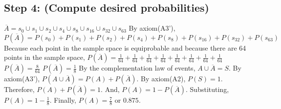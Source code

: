 \documentclass[a4paper,10pt]{article}
\begin{document}
\subsection{Step 4: (Compute desired probabilities)}
$ \overline{A} = s_{0} \cup s_{1} \cup s_{2} \cup s_{4} \cup s_{8} \cup s_{16} \cup s_{32} \cup s_{63} $ \newline
By axiom(A3'), \newline
$ P(\overline{A}) = P(s_{0}) + P(s_{1}) + P(s_{2}) + P(s_{4}) + P(s_{8}) + P(s_{16}) + P(s_{32}) + P(s_{63}) $ 
\newline
Because each point in the sample space is equiprobable and because there are 64 points in the sample space, \newline
$ P(\overline{A}) = \frac{1}{64} + \frac{1}{64} + \frac{1}{64} + \frac{1}{64} + \frac{1}{64} + \frac{1}{64} + 
\frac{1}{64} + \frac{1}{64} $ 
\newline
$ P(\overline{A}) = \frac{8}{64} $ \newline
$ P(\overline{A}) = \frac{1}{8} $ \newline
By the complementation law of events, $ A \cup \overline{A} = S. $ \newline
By axiom(A3'), $ P(A \cup \overline{A}) = P(A) + P(\overline{A}). $ \newline
By axiom(A2), $ P(S) = 1. $ \newline
Therefore, $ P(A) + P(\overline{A}) = 1. $ \newline
And, $ P(A) = 1 - P(\overline{A}). $ \newline
Substituting, $ P(A) = 1 - \frac{1}{8}. $ \newline
Finally, $ P(A) = \frac{7}{8} $ or $ 0.875. $ \newline 
\end{document}
